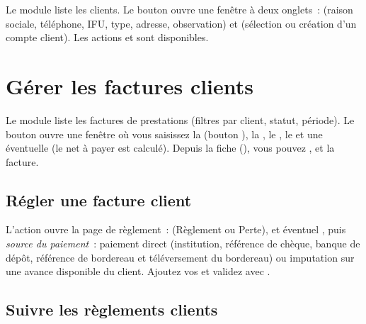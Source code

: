 Le module  liste les clients. Le bouton  ouvre une fenêtre à deux onglets~:  (raison sociale, téléphone, IFU, type, adresse, observation) et  (sélection ou création d'un compte client). Les actions  et  sont disponibles.


\section{Gérer les factures clients}

Le module  liste les factures de prestations (filtres par client, statut, période). Le bouton  ouvre une fenêtre où vous saisissez la  (bouton ), la , le , le  et une éventuelle  (le net à payer est calculé). Depuis la fiche (), vous pouvez ,  et  la facture.


\subsection{Régler une facture client}

L'action  ouvre la page de règlement~:  (Règlement ou Perte),  et éventuel , puis \emph{source du paiement}~: paiement direct (institution, référence de chèque, banque de dépôt, référence de bordereau et téléversement du bordereau) ou imputation sur une avance disponible du client. Ajoutez vos  et validez avec .


\subsection{Suivre les règlements clients}

